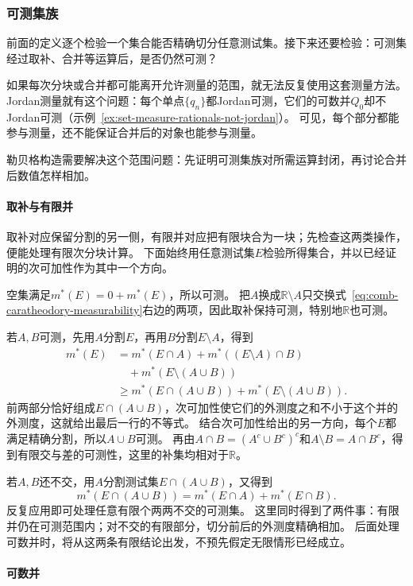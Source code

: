 \subsubsection{可测集族}

前面的定义逐个检验一个集合能否精确切分任意测试集。接下来还要检验：可测集经过取补、合并等运算后，是否仍然可测？

如果每次分块或合并都可能离开允许测量的范围，就无法反复使用这套测量方法。
Jordan测量就有这个问题：每个单点$\{q_n\}$都Jordan可测，它们的可数并$Q_0$却不Jordan可测（示例~\ref{ex:set-measure-rationals-not-jordan}）。
可见，每个部分都能参与测量，还不能保证合并后的对象也能参与测量。

勒贝格构造需要解决这个范围问题：先证明可测集族对所需运算封闭，再讨论合并后数值怎样相加。

\paragraph{取补与有限并}

取补对应保留分割的另一侧，有限并对应把有限块合为一块；先检查这两类操作，便能处理有限次分块计算。
下面始终用任意测试集$E$检验所得集合，并以已经证明的次可加性作为其中一个方向。

空集满足$m^*(E)=0+m^*(E)$，所以可测。
把$A$换成$\mathbb R\setminus A$只交换式~\eqref{eq:comb-caratheodory-measurability}右边的两项，因此取补保持可测，特别地$\mathbb R$也可测。

若$A,B$可测，先用$A$分割$E$，再用$B$分割$E\setminus A$，得到
\[
 \begin{aligned}
 m^*(E)&=m^*(E\cap A)+m^*((E\setminus A)\cap B)\\
 &\quad +m^*(E\setminus(A\cup B))\\
 &\geq m^*(E\cap(A\cup B))+m^*(E\setminus(A\cup B)).
 \end{aligned}
\]
前两部分恰好组成$E\cap(A\cup B)$，次可加性使它们的外测度之和不小于这个并的外测度，这就给出最后一行的不等式。
结合次可加性给出的另一方向，每个$E$都满足精确分割，所以$A\cup B$可测。
再由$A\cap B=(A^c\cup B^c)^c$和$A\setminus B=A\cap B^c$，得到有限交与差的可测性，这里的补集均相对于$\mathbb R$。

若$A,B$还不交，用$A$分割测试集$E\cap(A\cup B)$，又得到
\[
 m^*(E\cap(A\cup B))=m^*(E\cap A)+m^*(E\cap B).
\]
反复应用即可处理任意有限个两两不交的可测集。
这里同时得到了两件事：有限并仍在可测范围内；对不交的有限部分，切分前后的外测度精确相加。
后面处理可数并时，将从这两条有限结论出发，不预先假定无限情形已经成立。

\paragraph{可数并}

